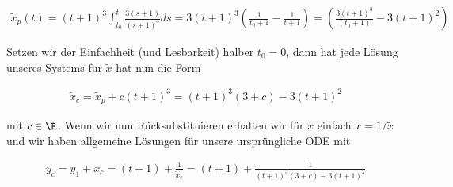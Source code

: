 \begin{solution}
\begin{enumerate}[label = \textbf{\alph*)}]
  \begin{align*}
    \widetilde{x}_p(t) = (t+1)^3 \int_{t_0}^t \frac{3(s+1)}{(s+1)^3}  ds=
    3(t+1)^3\left(\frac{1}{t_0 + 1}-\frac{1}{t+1}\right) = \left(
    \frac{3(t+1)^3}{(t_0+1)} - 3(t+1)^2\right)
  \end{align*}

  Setzen wir der Einfachheit (und Lesbarkeit) halber $t_0 = 0$, dann hat
  jede Lösung unseres Systems für $\widetilde{x}$ hat nun die Form

  \begin{align*}
    \widetilde{x}_c = \widetilde{x}_p + c(t+1)^3 = (t+1)^3(3+c)-3(t+1)^2
  \end{align*}

  mit $c \in \R$.
  Wenn wir nun Rücksubstituieren erhalten wir für $x$ einfach $x = 1/\widetilde{x}$ und
  wir haben allgemeine Lösungen für unsere ursprüngliche ODE mit

  \begin{align*}
    y_c = y_1 + x_c = (t+1) + \frac{1}{\widetilde{x}_c} = (t+1) + \frac{1}{(t+1)^3(3+c)-3(t+1)^2}
  \end{align*}
\end{enumerate}
\end{solution}
